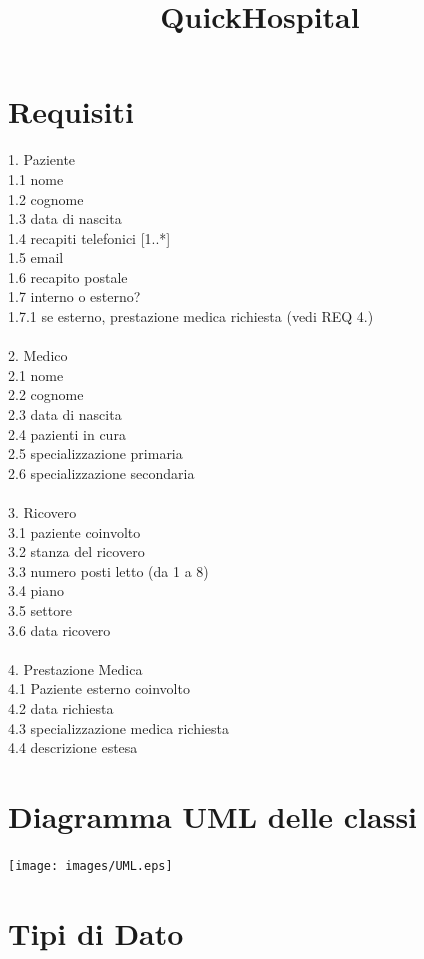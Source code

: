 \documentclass[12pt, letterpaper]{article}
\title{\textbf{QuickHospital}}
\date{}
\newcommand{\acc}{\\\hphantom{}\\}
\newcommand{\id}{{\hphantom{ident}}}
\begin{document}
\maketitle

\tableofcontents 
\newpage
\section{Requisiti}
1. Paziente \\ 
\id 1.1 nome \\
\id 1.2 cognome \\
\id 1.3 data di nascita \\ 
\id 1.4 recapiti telefonici [1..*] \\ 
\id 1.5 email \\ 
\id 1.6 recapito postale  \\
\id 1.7 interno o esterno? \\ 
\id \id 1.7.1 se esterno, prestazione medica richiesta (vedi REQ 4.)
\acc 
2. Medico \\ 
\id 2.1 nome \\ 
\id 2.2 cognome \\ 
\id 2.3 data di nascita \\ 
\id 2.4 pazienti in cura \\ 
\id 2.5 specializzazione primaria\\
\id 2.6 specializzazione secondaria\acc 
3. Ricovero \\ 
\id 3.1 paziente coinvolto \\ 
\id 3.2 stanza del ricovero \\ 
\id \id 3.3 numero posti letto (da 1 a 8)\\
\id \id 3.4 piano \\ 
\id \id 3.5 settore \\ 
\id \id 3.6 data ricovero \acc 
4. Prestazione Medica \\ 
\id 4.1 Paziente esterno coinvolto \\
\id 4.2 data richiesta \\
\id 4.3 specializzazione medica richiesta \\
\id 4.4 descrizione estesa
\newpage 
\section{Diagramma UML delle classi}
\begin{center}
    \texttt{[image: images/UML.eps]}
\end{center}
\section{Tipi di Dato}
\end{document}

